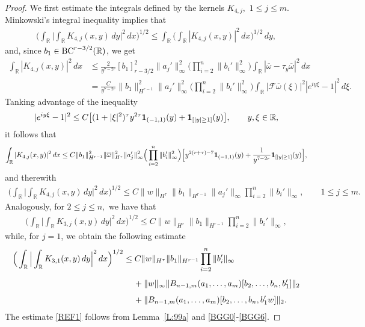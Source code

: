 \documentclass[11pt,reqno]{amsart}
\numberwithin{equation}{section}
\newcommand{\0}{\Omega}
\newcommand{\ov}{\overline}
\newcommand{\oo}{\ov\omega}
\newcommand{\R}{\mathbb{R}}
\numberwithin{equation}{section}
\begin{document}
\begin{proof}
We first estimate the integrals defined by  the kernels $K_{4,j},$ $1\leq j\leq m.$
Minkowski's  integral inequality  implies that 
\begin{align*}
\Big(\int_\R\Big|\int_\R K_{4,j}(x,y) \, dy\Big|^2\, dx\Big)^{1/2}\leq    \int_\R\Big(\int_\R |K_{4,j}(x,y)|^2\, dx\Big)^{1/2}\, dy,
\end{align*}
and, since  $b_1\in{\rm BC}^{r-3/2}(\R)$, we get
\begin{align*}
 \int_\R |K_{4,j}(x,y)|^2\, dx&\leq \frac{2 }{y^{7-2r}} [b_1]_{{r-3/2}}^2\|a_j'\|_\infty^2\Big(\prod_{i=2}^{n}\|b_i'\|_{\infty}^2\Big)\int_\R|\oo-\tau_y\oo|^2\, dx\\[1ex]
 &= \frac{C }{y^{7-2r}} \|b_1\|_{H^{r-1}}^2\|a_j'\|_\infty^2\Big(\prod_{i=2}^{n}\|b_i'\|_{\infty}^2\Big)\int_\R|\mathcal{F}\oo(\xi)|^2|e^{iy\xi}-1|^2\, d\xi.
\end{align*}
Tanking advantage of  the inequality
\[
|e^{iy\xi}-1|^2\leq  C\big[(1+|\xi|^2)^{\tau}y^{2\tau} {\bf 1}_{(-1,1)}(y)+ {\bf 1}_{[|y|\geq1]}(y)\big],\qquad y,\xi\in\R,
\]
it follows that
\[
\int_\R |K_{4,j}(x,y)|^2\, dx\leq C \|b_1\|_{H^{r-1}}^2\|\oo\|_{H^{\tau}}^2\|a_j'\|_\infty^2\Big(\prod_{i=2}^{n}\|b_i'\|_{\infty}^2\Big)  \Big[y^{2(r+\tau)-7} {\bf 1}_{(-1,1)}(y)+ \frac{1}{y^{7-2r}}{\bf 1}_{[|y|\geq1]}(y)\Big],
\]
and therewith 
\begin{align}\label{BGG4}
 \Big(\int_\R\Big|\int_\R K_{4,j}(x,y) \, dy\Big|^2\, dx\Big)^{1/2}\leq C\|   w\|_{H^\tau}\|b_1\|_{H^{r-1}}\|a_j'\|_\infty\prod_{i=2}^n\|b_i'\|_\infty,\qquad 1\leq j\leq m.
\end{align}
Analogously, for $2\leq j\leq n,$ we have that
\begin{align}\label{BGG5}
 \Big(\int_\R\Big|\int_\R K_{3,j}(x,y) \, dy\Big|^2\, dx\Big)^{1/2}\leq C \|w\|_{H^\tau}\|b_1\|_{H^{r-1}}\prod_{i=2}^n\|b_i'\|_\infty, 
\end{align}
while, for $j=1$, we obtain the following estimate
\begin{align}\label{BGG6}
\Big(\int_\R\Big|\int_\R K_{3,1}(x,y) \, dy\Big|^2\, dx\Big)^{1/2}&\leq C \|w\|_{H^\tau}\|b_1\|_{H^{r-1}}\prod_{i=2}^n\|b_i'\|_\infty\nonumber\\[1ex]
&\hspace{0.424cm}+\|w\|_\infty \|B_{n-1,m}(a_1,\ldots,a_m)[b_2,\ldots, b_n, b_1']\|_2\nonumber\\[1ex]
&\hspace{0.424cm}+\|B_{n-1,m}(a_1,\ldots,a_m)[b_2,\ldots, b_n, b_1'w]\|_2.
\end{align}
The  estimate \eqref{REF1} follows from Lemma~\ref{L:99a} and \eqref{BGG0}-\eqref{BGG6}. 
\end{proof}\medskip 
\end{document}
